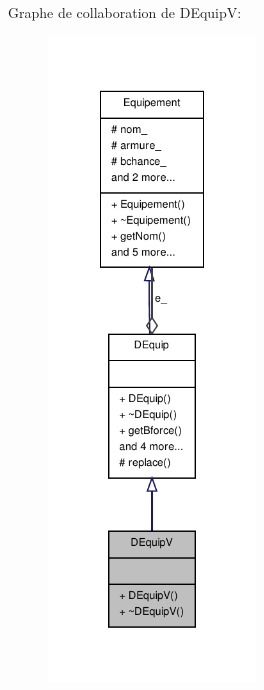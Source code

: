 Graphe de collaboration de D\-Equip\-V\-:
\nopagebreak
\begin{figure}[H]
\begin{center}
\leavevmode
\includegraphics[width=156pt]{class_d_equip_v__coll__graph}
\end{center}
\end{figure}
